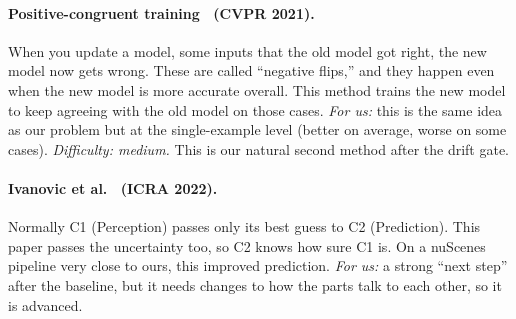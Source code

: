 \documentclass[11pt,a4paper]{article}
\begin{document}
\paragraph{Positive-congruent training~\cite{yan2021pctraining} (CVPR 2021).}
When you update a model, some inputs that the old model got right, the new
model now gets wrong. These are called ``negative flips,'' and they
happen even when the new model is more accurate overall. This method
trains the new model to keep agreeing with the old model on those cases.
\emph{For us:} this is the same idea as our problem but at the single-example
level (better on average, worse on some cases). \emph{Difficulty: medium.}
This is our natural second method after the drift gate.

\paragraph{Ivanovic et al.~\cite{ivanovic2022propagating} (ICRA 2022).}
Normally C1 (Perception) passes only its best guess to C2 (Prediction).
This paper passes the uncertainty too, so C2 knows how sure C1 is. On a
nuScenes pipeline very close to ours, this improved prediction.
\emph{For us:} a strong ``next step'' after the baseline, but it needs
changes to how the parts talk to each other, so it is advanced.
\end{document}
